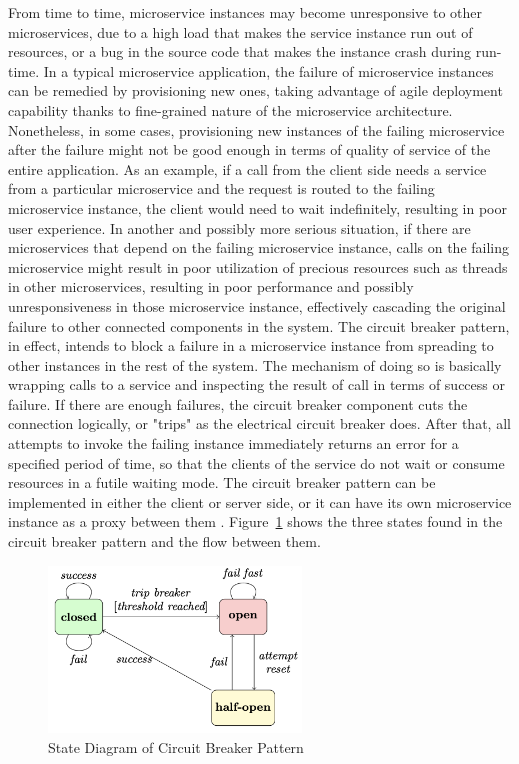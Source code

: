 \documentclass{Configuration_Files/PoliMi3i_thesis}
\begin{document}
From time to time, microservice instances may become unresponsive to other microservices, due to a high load that makes the service instance run out of resources, or a bug in the source code that makes the instance crash during run-time.
In a typical microservice application, the failure of microservice instances can be remedied by provisioning new ones, taking advantage of agile deployment capability thanks to fine-grained nature of the microservice architecture.
Nonetheless, in some cases, provisioning new instances of the failing microservice after the failure might not be good enough in terms of quality of service of the entire application.
As an example, if a call from the client side needs a service from a particular microservice and the request is routed to the failing microservice instance, the client would need to wait indefinitely, resulting in poor user experience.
In another and possibly more serious situation, if there are microservices that depend on the failing microservice instance, calls on the failing microservice might result in poor utilization of precious resources such as threads in other microservices, resulting in poor performance and possibly unresponsiveness in those microservice instance, effectively cascading the original failure to other connected components in the system.
The circuit breaker pattern, in effect, intends to block a failure in a microservice instance from spreading to other instances in the rest of the system.
The mechanism of doing so is basically wrapping calls to a service and inspecting the result of call in terms of success or failure.
If there are enough failures, the circuit breaker component cuts the connection logically, or "trips" as the electrical circuit breaker does.
After that, all attempts to invoke the failing instance immediately returns an error for a specified period of time, so that the clients of the service do not wait or consume resources in a futile waiting mode.
The circuit breaker pattern can be implemented in either the client or server side, or it can have its own microservice instance as a proxy between them \cite{montesi2016circuit}.
Figure~\ref{fig:circuit_breaker} shows the three states found in the circuit breaker pattern and the flow between them.

\begin{figure}[H]
\centering
\includegraphics[width=0.60\textwidth]{myImages/circuit_breaker.png}
\caption{State Diagram of Circuit Breaker Pattern}
\label{fig:circuit_breaker}
\end{figure}
\end{document}
